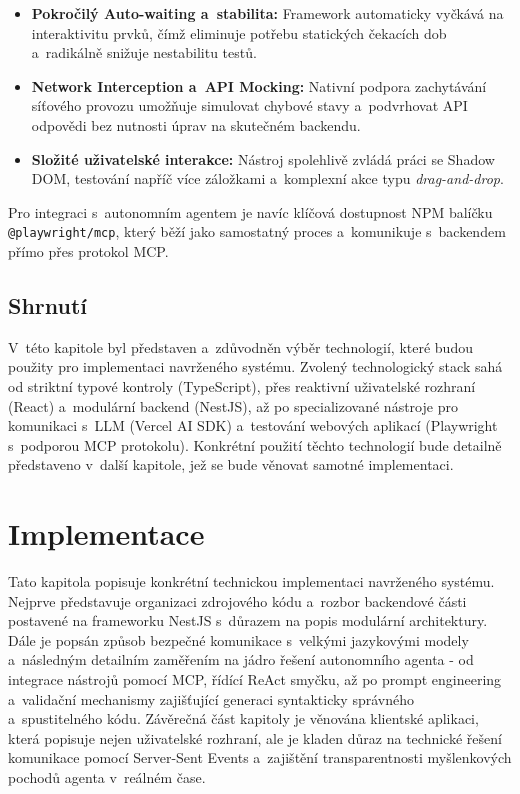 \documentclass[czech, ing, kiv, he, iso690numb, viewonly]{fasthesis}
\begin{document}
\begin{itemize}
    \item \textbf{Pokročilý Auto-waiting a~stabilita:} Framework automaticky vyčkává na interaktivitu prvků, čímž eliminuje potřebu statických čekacích dob a~radikálně snižuje nestabilitu testů.
    \item \textbf{Network Interception a~API Mocking:} Nativní podpora zachytávání síťového provozu umožňuje simulovat chybové stavy a~podvrhovat API odpovědi bez nutnosti úprav na skutečném backendu.
    \item \textbf{Složité uživatelské interakce:} Nástroj spolehlivě zvládá práci se Shadow DOM, testování napříč více záložkami a~komplexní akce typu \textit{drag-and-drop}.
\end{itemize}

Pro integraci s~autonomním agentem je navíc klíčová dostupnost NPM balíčku \texttt{@playwright/mcp}, 
který běží jako samostatný proces a~komunikuje s~backendem přímo přes protokol MCP.
 
\section{Shrnutí}
V~této kapitole byl představen a~zdůvodněn výběr technologií, které budou použity pro implementaci navrženého systému.
Zvolený technologický stack sahá od striktní typové kontroly (TypeScript), přes reaktivní uživatelské rozhraní (React) a~modulární backend (NestJS), 
až po specializované nástroje pro komunikaci s~LLM (Vercel AI SDK) a~testování webových aplikací (Playwright s~podporou MCP protokolu). 
Konkrétní použití těchto technologií bude detailně představeno v~další kapitole, jež se bude věnovat samotné implementaci.

\chapter{Implementace}\label{chapter:implementation}
Tato kapitola popisuje konkrétní technickou implementaci navrženého systému.
Nejprve představuje organizaci zdrojového kódu a~rozbor backendové části postavené na 
frameworku NestJS s~důrazem na popis modulární architektury.
Dále je popsán způsob bezpečné komunikace s~velkými jazykovými modely a~následným 
detailním zaměřením na jádro řešení autonomního agenta - od integrace nástrojů pomocí MCP,
řídící ReAct smyčku, až po prompt engineering a~validační mechanismy zajišťující generaci syntakticky správného a~spustitelného kódu.
Závěrečná část kapitoly je věnována klientské aplikaci, která popisuje nejen uživatelské rozhraní, 
ale je kladen důraz na technické řešení komunikace pomocí Server-Sent Events a~zajištění transparentnosti myšlenkových pochodů agenta v~reálném čase.
\end{document}
